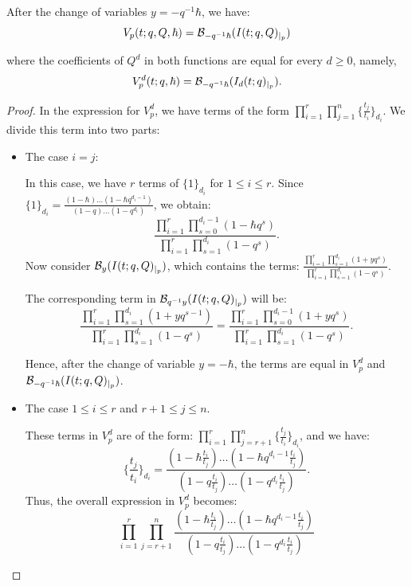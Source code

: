 \documentclass[10pt,a4paper]{amsart}
\begin{document}
\begin{thm} \label{main thm}
     After the change of variables $y=-q^{-1}\hbar$, we have: 
    \[
    V_p(t;q,Q,\hbar) = \mathcal{B}_{-q^{-1}\hbar}(I(t;q,Q)_{\arrowvert_{p}})
    \]

    where the coefficients of $Q^d$ in both functions are equal for every $d \geq 0$, namely,
    \[
    V_p^d(t;q,\hbar) = \mathcal{B}_{-q^{-1}\hbar}(I_d(t;q)_{\arrowvert_{p}}).
    \]
\end{thm}

\begin{proof}
     In the expression for $V_p^d$, we have terms of the form $\prod_{i=1}^{r}\prod_{j=1}^{n}\{\frac{t_j}{t_i}\}_{d_i}$. We divide this term into two parts:

   \begin{itemize}
       \item The case $i=j$:
       
       In this case, we have $r$ terms of $\{1\}_{d_i}$ for $1 \leq i \leq r$. Since $\{1\}_{d_i} = \frac{(1-\hbar)\dots(1-\hbar q^{d_i-1})}{(1-q)\dots(1-q^{d_i})}$, we obtain:
       \[
       \frac{\prod_{i=1}^r \prod_{s=0}^{d_i-1}(1-\hbar q^s)}{\prod_{i=1}^r \prod_{s=1}^{d_i}(1-q^s)}.
       \]
       Now consider $\mathcal{B}_{y}(I(t;q,Q)_{\arrowvert_{p}})$, which contains the terms: 
       $\frac{\prod_{i=1}^r\prod_{s=1}^{d_i}(1+yq^{s})}{\prod_{i=1 }^r\prod_{s=1}^{d_i}(1-q^{s})}$.
       
       The corresponding term in $\mathcal{B}_{q^{-1}y}(I(t;q,Q)_{\arrowvert_{p}})$ will be:
       \[
       \frac{\prod_{i=1}^r\prod_{s=1}^{d_i}(1+yq^{s-1})}{\prod_{i=1 }^r\prod_{s=1}^{d_i}(1-q^{s})} = \frac{\prod_{i=1}^r\prod_{s=0}^{d_i-1}(1+yq^{s})}{\prod_{i=1 }^r\prod_{s=1}^{d_i}(1-q^{s})}.
       \]
       
       Hence, after the change of variable $y=-\hbar$, the terms are equal in $V_p^d$ and $\mathcal{B}_{-q^{-1}\hbar}(I(t;q,Q)_{\arrowvert_{p}})$.

       \item The case $1 \leq i \leq r$ and $r+1 \leq j \leq n$.
       
       These terms in $V_p^d$ are of the form: $\prod_{i=1}^{r}\prod_{j=r+1}^{n}\{\frac{t_j}{t_i}\}_{d_i}$, and we have:
       \[
       \{\frac{t_j}{t_i}\}_{d_i} = \frac{(1-\hbar \frac{t_i}{t_j})\dots(1- \hbar q^{d_i-1}\frac{t_i}{t_j})}{(1-q \frac{t_i}{t_j})\dots(1-q^{d_i}\frac{t_i}{t_j})}.
       \]
       Thus, the overall expression in $V_p^d$ becomes:
       \[
\prod_{i=1}^r \prod_{j=r+1}^{n} \frac{(1-\hbar \frac{t_i}{t_j})\dots(1- \hbar q^{d_i-1}\frac{t_i}{t_j})}{(1-q \frac{t_i}{t_j})\dots(1-q^{d_i}\frac{t_i}{t_j})}   
       \]


\end{itemize}
\end{proof}
\end{document}

